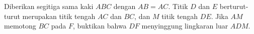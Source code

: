 Diberikan segitiga sama kaki $ABC$ dengan $AB=AC$. Titik $D$ dan $E$ berturut-turut merupakan titik tengah $AC$ dan $BC$, dan $M$ titik tengah $DE$. Jika $AM$ memotong $BC$ pada $F$, buktikan bahwa $DF$ menyinggung lingkaran luar $ADM$.